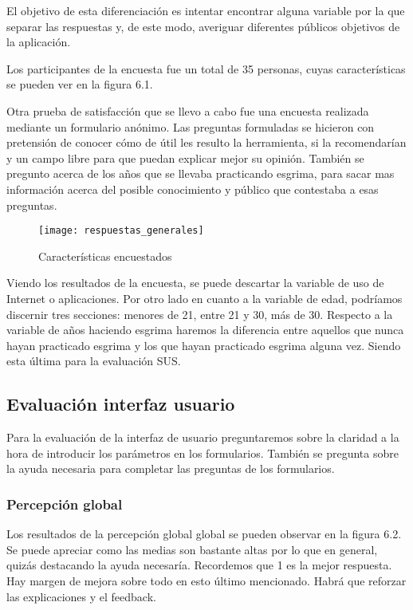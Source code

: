 El objetivo de esta diferenciación es intentar encontrar alguna variable por la que separar
las respuestas y, de este modo, averiguar diferentes públicos objetivos de la aplicación.

Los participantes de la encuesta fue un total de 35 personas, cuyas características se pueden ver en la figura 6.1.

Otra prueba de satisfacción que se llevo a cabo fue una encuesta realizada mediante un formulario
anónimo. Las preguntas formuladas se hicieron con pretensión de conocer cómo de útil les resulto
la herramienta, si la recomendarían y un campo libre para que puedan explicar mejor su opinión.
También se pregunto acerca de los años que se llevaba practicando esgrima, para sacar mas información
acerca del posible conocimiento y público que contestaba a esas preguntas.

\begin{figure}[htb]
  \centering
  \texttt{[image: respuestas\_generales]}
  \caption[Características encuestados]{Características encuestados}
  \label{fig:Características encuestados}
\end{figure}

Viendo los resultados de la encuesta, se puede descartar la variable de uso de Internet o aplicaciones.
Por otro lado en cuanto a la variable de edad, podríamos discernir tres secciones: menores de 21, entre 21
y 30, más de 30. Respecto a la variable de años haciendo esgrima haremos la diferencia entre aquellos
que nunca hayan practicado esgrima y los que hayan practicado esgrima alguna vez. Siendo esta última
para la evaluación SUS.

\subsection{Evaluación interfaz usuario}

Para la evaluación de la interfaz de usuario preguntaremos sobre la claridad a la hora de introducir
los parámetros en los formularios. También se pregunta sobre la ayuda necesaria para completar las preguntas de los formularios.

\subsubsection{Percepción global}

Los resultados de la percepción global global se pueden observar en la figura 6.2. Se puede apreciar
como las medias son bastante altas por lo que en general, quizás destacando la ayuda necesaría.
Recordemos que 1 es la mejor respuesta. Hay margen de mejora sobre todo en esto último mencionado.
Habrá que reforzar las explicaciones y el feedback.

